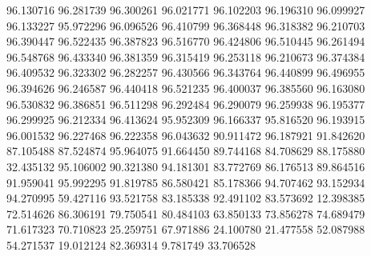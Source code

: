 96.130716
96.281739
96.300261
96.021771
96.102203
96.196310
96.099927
96.133227
95.972296
96.096526
96.410799
96.368448
96.318382
96.210703
96.390447
96.522435
96.387823
96.516770
96.424806
96.510445
96.261494
96.548768
96.433340
96.381359
96.315419
96.253118
96.210673
96.374384
96.409532
96.323302
96.282257
96.430566
96.343764
96.440899
96.496955
96.394626
96.246587
96.440418
96.521235
96.400037
96.385560
96.163080
96.530832
96.386851
96.511298
96.292484
96.290079
96.259938
96.195377
96.299925
96.212334
96.413624
95.952309
96.166337
95.816520
96.193915
96.001532
96.227468
96.222358
96.043632
90.911472
96.187921
91.842620
87.105488
87.524874
95.964075
91.664450
89.744168
84.708629
88.175880
32.435132
95.106002
90.321380
94.181301
83.772769
86.176513
89.864516
91.959041
95.992295
91.819785
86.580421
85.178366
94.707462
93.152934
94.270995
59.427116
93.521758
83.185338
92.491102
83.573692
12.398385
72.514626
86.306191
79.750541
80.484103
63.850133
73.856278
74.689479
71.617323
70.710823
25.259751
67.971886
24.100780
21.477558
52.087988
54.271537
19.012124
82.369314
9.781749
33.706528
